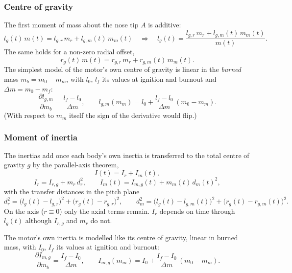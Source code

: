 \subsubsection{Centre of gravity}\label{sec:mass_cog}
The first moment of mass about the nose tip $A$ is additive:
\begin{equation}\label{eq:mass_cog}
    l_g(t)\,m(t) = l_{g,r}\,m_r + l_{g,m}(t)\,m_m(t)
    \quad\Longrightarrow\quad
    l_g(t) = \frac{l_{g,r}\,m_r + l_{g,m}(t)\,m_m(t)}{m(t)}.
\end{equation}
The same holds for a non-zero radial offset,
\begin{equation}\label{eq:mass_cog_r}
    r_g(t)\,m(t) = r_{g,r}\,m_r + r_{g,m}(t)\,m_m(t).
\end{equation}
The simplest model of the motor's own centre of gravity is linear in the \emph{burned} mass
$m_b=m_0-m_m$, with $l_0$, $l_f$ its values at ignition and burnout and $\Delta m=m_0-m_f$:
\begin{equation}\label{eq:mass_l_linear}
    \frac{\partial l_{g,m}}{\partial m_b}=\frac{l_f-l_0}{\Delta m},\qquad
    l_{g,m}(m_m)=l_0+\frac{l_f-l_0}{\Delta m}\,(m_0-m_m).
\end{equation}
(With respect to $m_m$ itself the sign of the derivative would flip.)

\subsubsection{Moment of inertia}\label{sec:mass_inertia}
The inertias add once each body's own inertia is transferred to the total centre of gravity $g$
by the parallel-axis theorem,
\begin{equation}\label{eq:mass_inertia}
    I(t) = I_r + I_m(t),
\end{equation}
\begin{equation}\label{eq:mass_inertia_parts}
    I_r = I_{r,g} + m_r\,d_r^2, \qquad I_m(t) = I_{m,g}(t) + m_m(t)\,d_m(t)^2,
\end{equation}
with the transfer distances in the pitch plane
\begin{equation}\label{eq:mass_dist}
    d_r^2=\bigl(l_g(t)-l_{g,r}\bigr)^2+\bigl(r_g(t)-r_{g,r}\bigr)^2, \qquad
    d_m^2=\bigl(l_g(t)-l_{g,m}(t)\bigr)^2+\bigl(r_g(t)-r_{g,m}(t)\bigr)^2.
\end{equation}
On the axis ($r\equiv0$) only the axial terms remain. $I_r$ depends on time through $l_g(t)$
although $I_{r,g}$ and $m_r$ do not.

The motor's own inertia is modelled like its centre of gravity, linear in burned mass, with $I_0$,
$I_f$ its values at ignition and burnout:
\begin{equation}\label{eq:mass_I_linear}
    \frac{\partial I_{m,g}}{\partial m_b}=\frac{I_f-I_0}{\Delta m},\qquad
    I_{m,g}(m_m)=I_0+\frac{I_f-I_0}{\Delta m}\,(m_0-m_m).
\end{equation}

